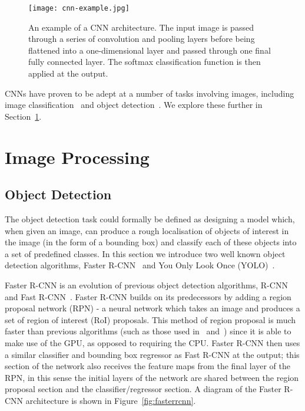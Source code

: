 \documentclass[../interim.tex]{subfiles}
\begin{document}
\begin{figure}
  \centering
  \texttt{[image: cnn-example.jpg]}
  \caption{An example of a CNN architecture. The input image is passed through a series of convolution and pooling layers before being flattened into a one-dimensional layer and passed through one final fully connected layer. The softmax classification function is then applied at the output.}
  \label{fig:example-cnn}
\end{figure}

CNNs have proven to be adept at a number of tasks involving images, including image classification~\cite{cnn-uses:classification} and object detection~\cite{cnn-uses:yolo-v3, cnn-uses:faster-r-cnn}. We explore these further in Section~\ref{section:image-proc}.


\section{Image Processing}
\label{section:image-proc}

\subsection{Object Detection}

The object detection task could formally be defined as designing a model which, when given an image, can produce a rough localisation of objects of interest in the image (in the form of a bounding box) and classify each of these objects into a set of predefined classes. In this section we introduce two well known object detection algorithms, Faster R-CNN~\cite{cnn-uses:faster-r-cnn} and You Only Look Once (YOLO)~\cite{cnn-uses:yolo-v3}.

Faster R-CNN is an evolution of previous object detection algorithms, R-CNN~\cite{r-cnn} and Fast R-CNN~\cite{fast-r-cnn}. Faster R-CNN builds on its predecessors by adding a region proposal network (RPN) - a neural network which takes an image and produces a set of region of interest (RoI) proposals. This method of region proposal is much faster than previous algorithms (such as those used in~\cite{r-cnn} and~\cite{fast-r-cnn}) since it is able to make use of the GPU, as opposed to requiring the CPU. Faster R-CNN then uses a similar classifier and bounding box regressor as Fast R-CNN at the output; this section of the network also receives the feature maps from the final layer of the RPN, in this sense the initial layers of the network are shared between the region proposal section and the classifier/regressor section. A diagram of the Faster R-CNN architecture is shown in Figure~\ref{fig:fasterrcnn}.
\end{document}
